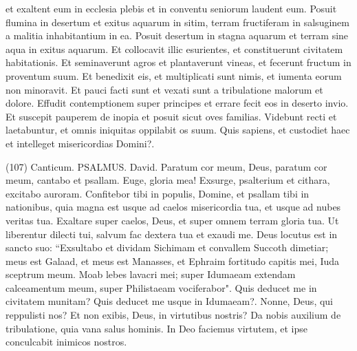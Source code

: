\begin{biblechapter}
\verse et exaltent eum in ecclesia plebis et in conventu seniorum laudent eum. 
\verse Posuit flumina in desertum et exitus aquarum in sitim, 
\verse terram fructiferam in salsuginem a malitia inhabitantium in ea. 
\verse Posuit desertum in stagna aquarum et terram sine aqua in exitus aquarum. 
\verse Et collocavit illic esurientes, et constituerunt civitatem habitationis. 
\verse Et seminaverunt agros et plantaverunt vineas, et fecerunt fructum in proventum suum. 
\verse Et benedixit eis, et multiplicati sunt nimis, et iumenta eorum non minoravit. 
\verse Et pauci facti sunt et vexati sunt a tribulatione malorum et dolore. 
\verse Effudit contemptionem super principes et errare fecit eos in deserto invio. 
\verse Et suscepit pauperem de inopia et posuit sicut oves familias. 
\verse Videbunt recti et laetabuntur, et omnis iniquitas oppilabit os suum. 
\verse Quis sapiens, et custodiet haec et intelleget misericordias Domini?. 
\end{biblechapter}

\begin{biblechapter}  (107) 
\verse  Canticum. PSALMUS. David. 
\verse Paratum cor meum, Deus, paratum cor meum, cantabo et psallam. Euge, gloria mea! 
\verse Exsurge, psalterium et cithara, excitabo auroram. 
\verse Confitebor tibi in populis, Domine, et psallam tibi in nationibus, 
\verse quia magna est usque ad caelos misericordia tua, et usque ad nubes veritas tua. 
\verse Exaltare super caelos, Deus, et super omnem terram gloria tua. 
\verse Ut liberentur dilecti tui, salvum fac dextera tua et exaudi me. 
\verse Deus locutus est in sancto suo: “Exsultabo et dividam Sichimam et convallem Succoth dimetiar; 
\verse meus est Galaad, et meus est Manasses, et Ephraim fortitudo capitis mei, Iuda sceptrum meum. 
\verse Moab lebes lavacri mei; super Idumaeam extendam calceamentum meum, super Philistaeam vociferabor". 
\verse Quis deducet me in civitatem munitam? Quis deducet me usque in Idumaeam?. 
\verse Nonne, Deus, qui reppulisti nos? Et non exibis, Deus, in virtutibus nostris? 
\verse Da nobis auxilium de tribulatione, quia vana salus hominis. 
\verse In Deo faciemus virtutem, et ipse conculcabit inimicos nostros. 
\end{biblechapter}


